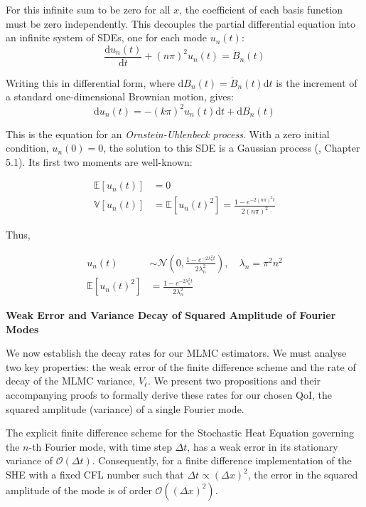 For
this infinite sum to be zero for all $x$, the coefficient of each basis
function must be zero independently. This decouples the partial differential 
equation into an infinite system of SDEs, one for each mode 
$u_n(t)$: 
$$\frac{\mathrm{d}u_n(t)}{\mathrm{d}t} + (n\pi)^2 u_n(t) = \dot{B}_n(t)$$

Writing this in differential form, where $\mathrm{d}B_n(t) = 
\dot{B}_n(t)\mathrm{d}t$ is the 
increment of a standard one-dimensional Brownian motion, 
gives:
$$
\mathrm{d}u_n(t) = -(k\pi)^2 u_n(t)\mathrm{d}t + \mathrm{d}B_n(t)
$$ 

This is the equation for an \textit{Ornstein-Uhlenbeck process}.
With a zero initial condition, $u_n(0)=0$, the solution to 
this SDE is a Gaussian process (\cite{oksendal2013stochastic}, Chapter 5.1). 
Its first two moments are well-known:

\begin{align}\label{eq:moments_of_fourier_modes}
\mathbb{E}[u_n(t)] &= 0 \\
\mathbb{V}[u_n(t)] &= \mathbb{E}[u_n(t)^2] = 
 \frac{1 - e^{-2(n\pi)^2 t}}{2(n\pi)^2} \label{eq:var_fourier_modes}
\end{align}

Thus,

\begin{align}
    u_n(t) &\sim \mathcal{N}(0, 
    \frac{1-e^{-2\lambda_n^2t}}{2\lambda_n^2}), 
    \quad \lambda_n = \pi^2 n^2
    \nonumber
    \\
    \mathbb{E}\left[u_n(t)^2\right] &= \frac{1 - e^{-2\lambda_n^2t}}{2\lambda_n^2}
    \label{eq:squared_amplitude_analytic}
\end{align}
\newline

\textbf{Weak Error and Variance Decay of Squared Amplitude of Fourier Modes}

We now establish the decay
rates for our MLMC estimators. We must analyse two key properties:
the weak error of the finite difference scheme and the rate 
of decay of the MLMC variance, $V_\ell$. We present 
two propositions and their accompanying proofs to formally 
derive these rates for our chosen QoI, the squared amplitude (variance)
of a single Fourier mode. 

\begin{proposition}
    \label{prop:weak_error_for_fourier_mode}
    The explicit finite difference scheme for the Stochastic Heat Equation
    governing the $n$-th Fourier mode, with time step $\Delta t$, has a weak error 
    in its stationary variance of 
    $\mathcal{O}(\Delta t)$. Consequently, for a finite difference 
    implementation of the SHE with a fixed CFL number such that 
    $\Delta t \propto (\Delta x)^2$, the error in the squared amplitude of the mode 
    is of order $\mathcal{O}((\Delta x)^2)$. 
\end{proposition}

